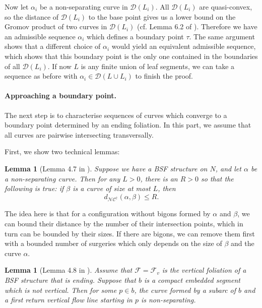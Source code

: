 \documentclass[10pt,a4paper]{amsart}
\newtheorem{lemma}[theorem]{Lemma}
\newcommand{\fncg}{\mathcal{NC}^\dagger}
\begin{document}
Now let $\alpha_i$ be a non-separating curve in $\mathcal{D}(L_i)$.
All $\mathcal{D}(L_i)$ are quasi-convex, so the distance of $\mathcal{D}(L_i)$ to the base point gives us a lower bound on the Gromov product of two curves in $\mathcal{D}(L_i)$ (cf. Lemma 6.2 of \cite{bowditch-notes}).
Therefore we have an admissible sequence $\alpha_i$ which defines a boundary point $\tau$.
The same argument shows that a different choice of $\alpha_i$ would yield an equivalent admissible sequence, which shows that this boundary point is the only one contained in the boundaries of all $\mathcal{D}(L_i)$.
If now $L$ is any finite union of leaf segments, we can take a sequence as before with $\alpha_i\in \mathcal{D}(L\cup L_i)$ to finish the proof.

\paragraph{Approaching a boundary point.}
The next step is to characterise sequences of curves which converge to a boundary point determined by an ending foliation.
In this part, we assume that all curves are pairwise intersecting transversally.

First, we show two technical lemmas:

\begin{lemma}[Lemma 4.7 in \cite{BHW2}]\label{lem:size-bounds-distance}
Suppose we have a BSF structure on $N$, and let $\alpha$ be a non-separating curve.
Then for any $L>0$, there is an $R>0$ so that the following is true:
if $\beta$ is a curve of size at most $L$, then 
\[ d_{\fncg}(\alpha,\beta) \leq R. \]
\end{lemma}

The idea here is that for a configuration without bigons formed by $\alpha$ and $\beta$, we can bound their distance by the number of their intersection points, which in turn can be bounded by their sizes.
If there are bigons, we can remove them first with a bounded number of surgeries which only depends on the size of $\beta$ and the curve $\alpha$.

\begin{lemma}[Lemma 4.8 in \cite{BHW2}]\label{lem:bicorn-existence}
Assume that $\mathcal{F}= \mathcal{F}_v$ is the vertical foliation of a BSF structure that is ending.
Suppose that $b$ is a compact embedded segment which is not vertical.
Then for some $p\in b$, the curve formed by a subarc of $b$ and a first return vertical flow line starting in $p$ is non-separating.
\end{lemma}    
\end{document}

